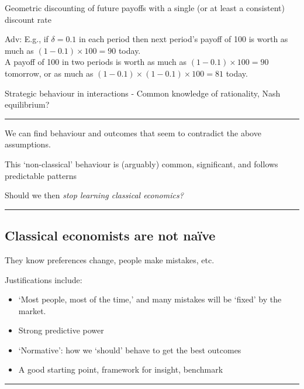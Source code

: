 \documentclass[]{article}
\providecommand{\tightlist}{%
  \setlength{\itemsep}{0pt}\setlength{\parskip}{0pt}}
\begin{document}
\bigskip

Geometric discounting of future payoffs with a single (or at least a
consistent) discount rate

Adv: E.g., if \(\delta=0.1\) in each period then next period's payoff of
100 is worth as much as \((1-0.1) \times 100 = 90\) today.\\
A payoff of 100 in two periods is worth as much as
\((1-0.1) \times 100 = 90\) tomorrow, or as much as
\((1-0.1) \times (1-0.1)\times 100 = 81\) today.

\bigskip

Strategic behaviour in interactions - Common knowledge of rationality,
Nash equilibrium?

\begin{center}\rule{0.5\linewidth}{\linethickness}\end{center}

We can find behaviour and outcomes that seem to contradict the above
assumptions.

This `non-classical' behaviour is (arguably) common, significant, and
follows predictable patterns

Should we then \emph{stop learning classical economics?}

\begin{center}\rule{0.5\linewidth}{\linethickness}\end{center}

\hypertarget{classical-economists-are-not-nauxefve}{%
\subsection{Classical economists are not
naïve}\label{classical-economists-are-not-nauxefve}}

They know preferences change, people make mistakes, etc.

Justifications include:

\begin{itemize}
\tightlist
\item
  `Most people, most of the time,' and many mistakes will be `fixed' by
  the market.
\item
  Strong predictive power
\item
  `Normative': how we `should' behave to get the best outcomes
\item
  A good starting point, framework for insight, benchmark
\end{itemize}

\begin{center}\rule{0.5\linewidth}{\linethickness}\end{center}
\end{document}
